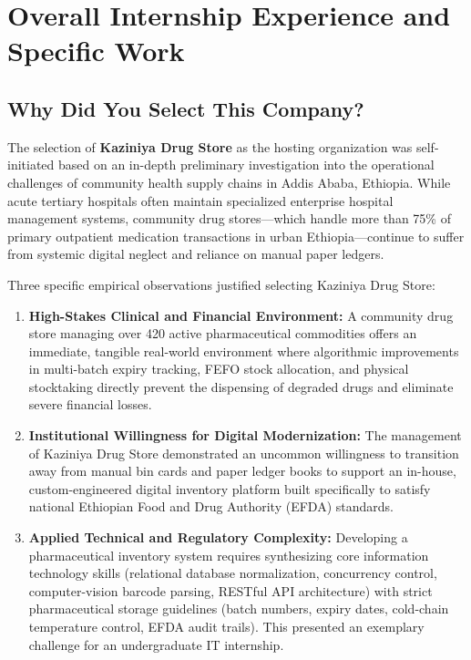 \chapter{Overall Internship Experience and Specific Work}
\label{chap:internship_experience}

\section{Why Did You Select This Company?}
The selection of \textbf{Kaziniya Drug Store} as the hosting organization was self-initiated based on an in-depth preliminary investigation into the operational challenges of community health supply chains in Addis Ababa, Ethiopia. While acute tertiary hospitals often maintain specialized enterprise hospital management systems, community drug stores—which handle more than 75\% of primary outpatient medication transactions in urban Ethiopia—continue to suffer from systemic digital neglect and reliance on manual paper ledgers.

Three specific empirical observations justified selecting Kaziniya Drug Store:
\begin{enumerate}
    \item \textbf{High-Stakes Clinical and Financial Environment:} A community drug store managing over 420 active pharmaceutical commodities offers an immediate, tangible real-world environment where algorithmic improvements in multi-batch expiry tracking, FEFO stock allocation, and physical stocktaking directly prevent the dispensing of degraded drugs and eliminate severe financial losses.
    \item \textbf{Institutional Willingness for Digital Modernization:} The management of Kaziniya Drug Store demonstrated an uncommon willingness to transition away from manual bin cards and paper ledger books to support an in-house, custom-engineered digital inventory platform built specifically to satisfy national Ethiopian Food and Drug Authority (EFDA) standards.
    \item \textbf{Applied Technical and Regulatory Complexity:} Developing a pharmaceutical inventory system requires synthesizing core information technology skills (relational database normalization, concurrency control, computer-vision barcode parsing, RESTful API architecture) with strict pharmaceutical storage guidelines (batch numbers, expiry dates, cold-chain temperature control, EFDA audit trails). This presented an exemplary challenge for an undergraduate IT internship.
\end{enumerate}

